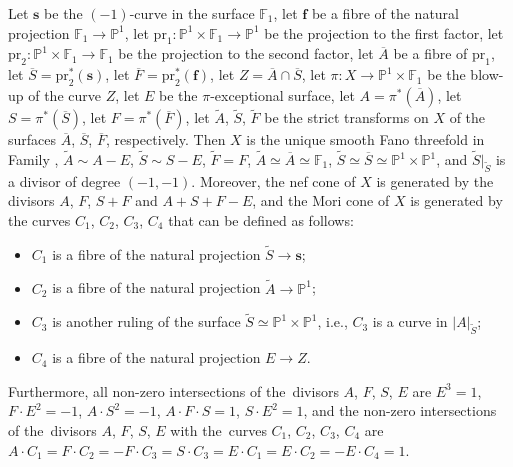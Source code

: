 \documentclass[12pt]{amsart}
\theoremstyle{definition}
\theoremstyle{remark}
\begin{document}
Let $\mathbf{s}$ be the $(-1)$-curve in the surface $\mathbb{F}_1$, let $\mathbf{f}$ be a fibre of the natural projection $\mathbb{F}_1\to\mathbb{P}^1$, let $\mathrm{pr}_1\colon\mathbb{P}^1\times\mathbb{F}_1\to \mathbb{P}^1$ be the projection to the first factor, let $\mathrm{pr}_2\colon\mathbb{P}^1\times\mathbb{F}_1\to \mathbb{F}_1$ be the projection to the second factor, let $\overline{A}$ be a fibre of $\mathrm{pr}_1$, let $\overline{S}=\mathrm{pr}_2^*(\mathbf{s})$, let $\overline{F}=\mathrm{pr}_2^*(\mathbf{f})$, let $Z=\overline{A}\cap\overline{S}$, let $\pi\colon X\to\mathbb{P}^1\times\mathbb{F}_1$ be the blow-up of the curve $Z$, let $E$ be the $\pi$-exceptional surface, let $A=\pi^*(\overline{A})$, let $S=\pi^*(\overline{S})$, let $F=\pi^*(\overline{F})$, let $\widetilde{A}$, $\widetilde{S}$, $\widetilde{F}$ be the strict transforms on $X$ of the surfaces $\overline{A}$, $\overline{S}$, $\overline{F}$, respectively. Then $X$ is the unique smooth Fano threefold in Family , $\widetilde{A}\sim A-E$, $\widetilde{S}\sim S-E$, $\widetilde{F}=F$, $\widetilde{A}\simeq\overline{A}\simeq\mathbb{F}_1$, $\widetilde{S}\simeq\overline{S}\simeq\mathbb{P}^1\times\mathbb{P}^1$, and  $\widetilde{S}\vert_{\widetilde{S}}$ is a divisor of degree $(-1,-1)$.
Moreover, the nef cone of $X$ is generated by the divisors $A$, $F$, $S+F$ and $A+S+F-E$, and the Mori cone of $X$ is generated by the curves $C_1$, $C_2$, $C_3$, $C_4$ that can be defined as follows:
\begin{itemize}
\item $C_1$ is a fibre of the natural projection $\widetilde{S}\to\mathbf{s}$;
\item $C_2$ is a fibre of the natural projection $\widetilde{A}\to\mathbb{P}^1$;
\item $C_3$ is another ruling of the surface $\widetilde{S}\simeq\mathbb{P}^1\times\mathbb{P}^1$, i.e., $C_3$ is a curve in $|A\vert_{\widetilde{S}}$;
\item $C_4$ is a fibre of the natural projection $E\to Z$.
\end{itemize}
Furthermore, all non-zero intersections of the~divisors $A$, $F$, $S$, $E$ are
$E^3=1$, $F\cdot E^2=-1$, $A\cdot S^2=-1$, $A\cdot F\cdot S=1$, $S\cdot E^2=1$, and the non-zero intersections of the~divisors $A$, $F$, $S$, $E$  with the~curves $C_1$, $C_2$, $C_3$, $C_4$ are $A\cdot C_1=F\cdot C_2=-F\cdot C_3=S\cdot C_3=E\cdot C_1=E\cdot C_2=-E\cdot C_4=1.$
\end{document}
